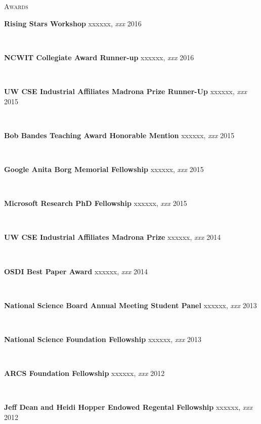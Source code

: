 \documentclass[10pt,times]{report}
\newlength{\sectiongap}
\newlength{\entrygap}
\newlength{\sectioncolwidth}
\newlength{\colgap}
\newlength{\stuffwidth}
\def\ifEqString#1#2{\def\testa{#1}\def\testb{#2}%
  \ifx\testa\testb}
\newenvironment{rtable}{
  \begin{minipage}{\textwidth}
  }{
  \end{minipage}
}
\newenvironment{rentry}[3][xxx]{
  \begin{minipage}[t]{\hsize}
    \textbf{#2}\ifEqString{#1}{xxx}\relax\else, \textit{#1}\fi
    \hspace{\stretch{1}} #3 \\
  }{
    \removelastskip
  \end{minipage}
  \\[\entrygap]  %
}
\newenvironment{rsection}[1]{
  \begin{minipage}[t]{\sectioncolwidth}
    \textsc{#1}
  \end{minipage}
  \hspace{\colgap}
  \begin{minipage}[t]{\stuffwidth}
  }{
    \removelastskip
  \end{minipage}
  \\[\sectiongap]
}
\begin{document}
\begin{rtable}
  \begin{rsection}{Awards}
    \begin{rentry}{Rising Stars Workshop}{2016}
      \vspace{-0.5em}
    \end{rentry} 
    \begin{rentry}{NCWIT Collegiate Award Runner-up}{2016}
      \vspace{-0.5em}
    \end{rentry} 
    \begin{rentry}{UW CSE Industrial Affiliates Madrona Prize Runner-Up}{2015}
      \vspace{-0.5em}
    \end{rentry} 
    \begin{rentry}{Bob Bandes Teaching Award Honorable Mention}{2015}
      \vspace{-0.5em}
    \end{rentry} 
    \begin{rentry}{Google Anita Borg Memorial Fellowship}{2015}
      \vspace{-0.5em}
    \end{rentry} 
    \begin{rentry}{Microsoft Research PhD Fellowship}{2015}
      \vspace{-0.5em}
    \end{rentry} 
    \begin{rentry}{UW CSE Industrial Affiliates Madrona Prize}{2014}
       \vspace{-0.5em}
    \end{rentry}
    \begin{rentry}{OSDI Best Paper Award}{2014}
      \vspace{-0.5em}
    \end{rentry}
    \begin{rentry}{National Science Board Annual Meeting Student
        Panel}{2013}
      \vspace{-0.5em}
    \end{rentry}
    \begin{rentry}{National Science Foundation Fellowship}{2013}
      \vspace{-0.5em}
    \end{rentry}
    \begin{rentry}{ARCS Foundation Fellowship}{2012}
       \vspace{-0.5em}
    \end{rentry}
    \begin{rentry}{Jeff Dean and Heidi Hopper Endowed Regental Fellowship}{2012}

\end{rentry}
\end{rsection}
\end{rtable}
\end{document}

